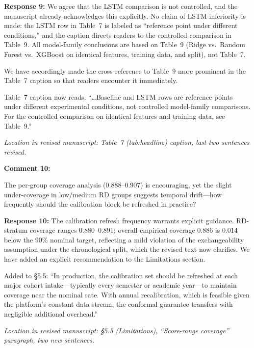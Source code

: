 \documentclass[11pt]{article}
\newcommand{\rev}[1]{{\color{ccolor}#1}}
\begin{document}
\textbf{Response 9:}
We agree that the LSTM comparison is not controlled, and the manuscript already
acknowledges this explicitly. No claim of LSTM inferiority is made: the LSTM row in
Table~7 is labeled as ``reference point under different conditions,'' and the caption
directs readers to the controlled comparison in Table~9. All model-family conclusions
are based on Table~9 (Ridge vs.\ Random Forest vs.\ XGBoost on identical features,
training data, and split), not Table~7.

We have accordingly made the cross-reference to Table~9 more prominent in the
Table~7 caption so that readers encounter it immediately.

\rev{Table~7 caption now reads: ``\ldots Baseline and LSTM rows are reference points
under different experimental conditions, not controlled model-family comparisons. For
the controlled comparison on identical features and training data, see Table~9.''}

\textit{Location in revised manuscript: Table~7 (tab:headline) caption, last two
sentences revised.}

\bigskip

\textbf{Comment 10:}
\begin{rquote}
The per-group coverage analysis (0.888--0.907) is encouraging, yet the slight
under-coverage in low/medium RD groups suggests temporal drift---how frequently should
the calibration block be refreshed in practice?
\end{rquote}

\textbf{Response 10:}
The calibration refresh frequency warrants explicit guidance.
RD-stratum coverage ranges 0.880--0.891; overall empirical coverage 0.886 is 0.014
below the 90\% nominal target, reflecting a mild violation of the exchangeability
assumption under the chronological split, which the revised text now clarifies.
We have added an explicit recommendation to the Limitations section.

\rev{Added to \S5.5: ``In production, the calibration set should be refreshed at each
major cohort intake---typically every semester or academic year---to maintain coverage
near the nominal rate. With annual recalibration, which is feasible given the
platform's constant data stream, the conformal guarantee transfers with negligible
additional overhead.''}

\textit{Location in revised manuscript: \S5.5 (Limitations), ``Score-range coverage''
paragraph, two new sentences.}

\bigskip
\end{document}
